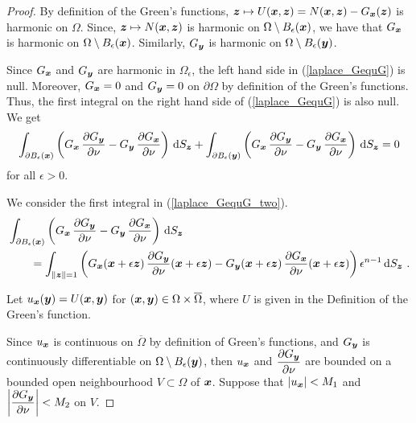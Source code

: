 \begin{proof}
By definition of the Green's functions,
${\bm{z}} \mapsto U({\bm{x}},{\bm{z}})
= N({\bm{x}},{\bm{z}}) - G_{{\bm{x}}}({\bm{z}})$
is harmonic on $\Omega$.
Since, ${\bm{z}} \mapsto N({\bm{x}},{\bm{z}})$ is harmonic on
$\Omega \setminus B_{\epsilon}({\bm{x}})$, we have that
$G_{{\bm{x}}}$ is harmonic on $\Omega \setminus B_{\epsilon}({\bm{x}})$.
Similarly, $G_{{\bm{y}}}$ is harmonic on
$\Omega \setminus B_{\epsilon}({\bm{y}})$.

Since $G_{{\bm{x}}}$ and $G_{{\bm{y}}}$ are harmonic in
$\Omega_{\epsilon}$, the left hand 
side in (\ref{laplace_GequG}) is null.  Moreover,
$G_{{\bm{x}}} = 0$ and $G_{{\bm{y}}}=0$ on $\partial \Omega$ by
definition of the Green's functions.  Thus, the first integral on the
right hand side of (\ref{laplace_GequG}) is also null.  We get
\begin{equation} \label{laplace_GequG_two}
\int_{\partial B_{\epsilon}({\bm{x}})}
\left( G_{{\bm{x}}}\,\frac{\partial{G_{{\bm{y}}}}}{\partial \nu} 
- G_{{\bm{y}}}\,\frac{\partial{G_{{\bm{x}}}}}{\partial \nu} \right) \,\mathrm{d}{S}_{{\bm{z}}}
+ \int_{\partial B_{\epsilon}({\bm{y}})}
\left( G_{{\bm{x}}}\,\frac{\partial{G_{{\bm{y}}}}}{\partial \nu} 
- G_{{\bm{y}}}\,\frac{\partial{G_{{\bm{x}}}}}{\partial \nu} \right) \,\mathrm{d}{S}_{{\bm{z}}} = 0
\end{equation}
for all $\epsilon >0$.

We consider the first integral in
(\ref{laplace_GequG_two}).
\begin{equation} \label{laplace_GequG_three}
\begin{split} 
&\int_{\partial B_{\epsilon}({\bm{x}})}
\left( G_{{\bm{x}}}\,\frac{\partial{G_{{\bm{y}}}}}{\partial \nu} 
- G_{{\bm{y}}}\,\frac{\partial{G_{{\bm{x}}}}}{\partial \nu} \right) \,\mathrm{d}{S}_{{\bm{z}}} \\
&\qquad = \int_{\|{\bm{z}}\|=1}
\left( G_{{\bm{x}}}({\bm{x}}+\epsilon {\bm{z}})
\,\frac{\partial{G_{{\bm{y}}}}}{\partial \nu}({\bm{x}}+\epsilon {\bm{z}})
- G_{{\bm{y}}}({\bm{x}}+\epsilon {\bm{z}})
\,\frac{\partial{G_{{\bm{x}}}}}{\partial \nu}({\bm{x}}+\epsilon {\bm{z}}) \right)
\epsilon^{n-1}\,\mathrm{d}{S}_{{\bm{z}}} \ .
\end{split}
\end{equation}

 Let $u_{{\bm{x}}}({\bm{y}}) = U({\bm{x}},{\bm{y}})$ for
$({\bm{x}},{\bm{y}}) \in \Omega \times \overline{\Omega}$, where $U$ is
given in the Definition of the Green's function.

Since $u_{{\bm{x}}}$ is continuous on $\overline{\Omega}$ by definition
of Green's functions, and $G_{{\bm{y}}}$ is continuously differentiable
on $\Omega \setminus B_{\epsilon}({\bm{y}})$, then $u_{{\bm{x}}}$ and
$\displaystyle \frac{\partial{G_{{\bm{y}}}}}{\partial \nu}$ are bounded on a
bounded open neighbourhood $V \subset \Omega$ of ${\bm{x}}$.  Suppose that
$|u_{{\bm{x}}}| < M_1$ and
$\displaystyle \left| \frac{\partial{G_{{\bm{y}}}}}{\partial \nu}\right| < M_2$
on $V$.


\end{proof}
